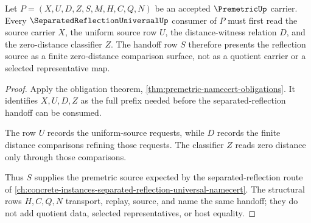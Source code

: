 \begin{theorem}
\label{thm:premetric-separated-reflection-route}
Let $P=(X,U,D,Z,S,M,H,C,Q,N)$ be an accepted $\PremetricUp$ carrier. Every $\SeparatedReflectionUniversalUp$ consumer of $P$ must first read the source carrier $X$, the uniform source row $U$, the distance-witness relation $D$, and the zero-distance classifier $Z$. The handoff row $S$ therefore presents the reflection source as a finite zero-distance comparison surface, not as a quotient carrier or a selected representative map.
\end{theorem}
\begin{proof}
Apply the obligation theorem, \autoref{thm:premetric-namecert-obligations}. It identifies $X,U,D,Z$ as the full prefix needed before the separated-reflection handoff can be consumed.

The row $U$ records the uniform-source requests, while $D$ records the finite distance comparisons refining those requests. The classifier $Z$ reads zero distance only through those comparisons.

Thus $S$ supplies the premetric source expected by the separated-reflection route of \autoref{ch:concrete-instances-separated-reflection-universal-namecert}. The structural rows $H,C,Q,N$ transport, replay, source, and name the same handoff; they do not add quotient data, selected representatives, or host equality.
\end{proof}

